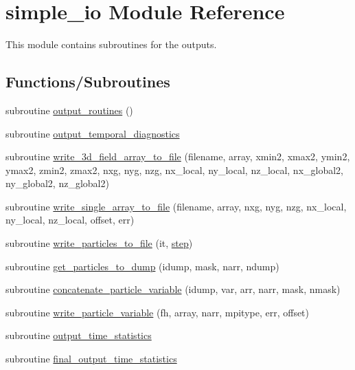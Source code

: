 \hypertarget{namespacesimple__io}{}\section{simple\+\_\+io Module Reference}
\label{namespacesimple__io}


This module contains subroutines for the outputs.  


\subsection*{Functions/\+Subroutines}
\begin{DoxyCompactItemize}
\item 
subroutine \hyperlink{namespacesimple__io_afa460efbda992ca175d786f86ab09ee9}{output\+\_\+routines} ()
\item 
subroutine \hyperlink{namespacesimple__io_acb0fc119c4f9a03b88d4129ec0036e1c}{output\+\_\+temporal\+\_\+diagnostics}
\item 
subroutine \hyperlink{namespacesimple__io_a2100e8a4cfe3bc3c9e2dcc93988d6551}{write\+\_\+3d\+\_\+field\+\_\+array\+\_\+to\+\_\+file} (filename, array,                                                               xmin2, xmax2, ymin2, ymax2, zmin2, zmax2, nxg, nyg, nzg, nx\+\_\+local,                                               ny\+\_\+local, nz\+\_\+local, nx\+\_\+global2, ny\+\_\+global2, nz\+\_\+global2)
\item 
subroutine \hyperlink{namespacesimple__io_a506cc0f775048e27bb5ccd9e936592d3}{write\+\_\+single\+\_\+array\+\_\+to\+\_\+file} (filename, array, nxg, nyg, nzg, nx\+\_\+local, ny\+\_\+local, nz\+\_\+local, offset, err)
\item 
subroutine \hyperlink{namespacesimple__io_a02b043d1424f1b2d25e47a55e697a5aa}{write\+\_\+particles\+\_\+to\+\_\+file} (it, \hyperlink{submain_8_f90_ae0a3ce7909f5d34b3684e226b780a075}{step})
\item 
subroutine \hyperlink{namespacesimple__io_abb3c1220ac70ea28fcbce1cd9c03b294}{get\+\_\+particles\+\_\+to\+\_\+dump} (idump, mask, narr, ndump)
\item 
subroutine \hyperlink{namespacesimple__io_a97c3b871fecd4b1341301fa6cf00a8fa}{concatenate\+\_\+particle\+\_\+variable} (idump, var, arr, narr, mask, nmask)
\item 
subroutine \hyperlink{namespacesimple__io_aad8ee8298c20d69fabcd6eb5a8b7b620}{write\+\_\+particle\+\_\+variable} (fh, array, narr, mpitype, err, offset)
\item 
subroutine \hyperlink{namespacesimple__io_a87d8855ebcd3134e3cfaeb7f6c548249}{output\+\_\+time\+\_\+statistics}
\item 
subroutine \hyperlink{namespacesimple__io_a4f7eec6a6854f8127e7bfdfa307d7bb9}{final\+\_\+output\+\_\+time\+\_\+statistics}
\end{DoxyCompactItemize}


